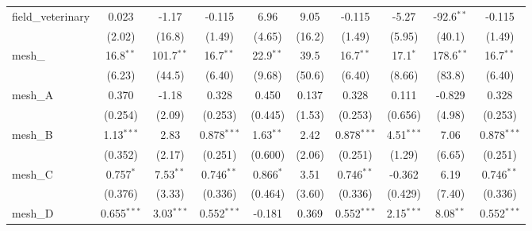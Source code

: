 \begin{tabular}{lccccccccc}
   field\_veterinary                                           & 0.023          & -1.17          & -0.115         & 6.96           & 9.05          & -0.115         & -5.27          & -92.6$^{**}$   & -0.115\\   
                                                               & (2.02)         & (16.8)         & (1.49)         & (4.65)         & (16.2)        & (1.49)         & (5.95)         & (40.1)         & (1.49)\\   
   mesh\_                                                      & 16.8$^{**}$    & 101.7$^{**}$   & 16.7$^{**}$    & 22.9$^{**}$    & 39.5          & 16.7$^{**}$    & 17.1$^{*}$     & 178.6$^{**}$   & 16.7$^{**}$\\   
                                                               & (6.23)         & (44.5)         & (6.40)         & (9.68)         & (50.6)        & (6.40)         & (8.66)         & (83.8)         & (6.40)\\   
   mesh\_A                                                     & 0.370          & -1.18          & 0.328          & 0.450          & 0.137         & 0.328          & 0.111          & -0.829         & 0.328\\   
                                                               & (0.254)        & (2.09)         & (0.253)        & (0.445)        & (1.53)        & (0.253)        & (0.656)        & (4.98)         & (0.253)\\   
   mesh\_B                                                     & 1.13$^{***}$   & 2.83           & 0.878$^{***}$  & 1.63$^{**}$    & 2.42          & 0.878$^{***}$  & 4.51$^{***}$   & 7.06           & 0.878$^{***}$\\   
                                                               & (0.352)        & (2.17)         & (0.251)        & (0.600)        & (2.06)        & (0.251)        & (1.29)         & (6.65)         & (0.251)\\   
   mesh\_C                                                     & 0.757$^{*}$    & 7.53$^{**}$    & 0.746$^{**}$   & 0.866$^{*}$    & 3.51          & 0.746$^{**}$   & -0.362         & 6.19           & 0.746$^{**}$\\   
                                                               & (0.376)        & (3.33)         & (0.336)        & (0.464)        & (3.60)        & (0.336)        & (0.429)        & (7.40)         & (0.336)\\   
   mesh\_D                                                     & 0.655$^{***}$  & 3.03$^{***}$   & 0.552$^{***}$  & -0.181         & 0.369         & 0.552$^{***}$  & 2.15$^{***}$   & 8.08$^{**}$    & 0.552$^{***}$\\   

\end{tabular}
